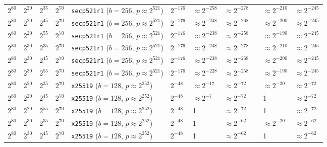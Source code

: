 \begin{table}[p]
\begin{tabular}{@{}lllllllllll@{}}
\midrule
$2^{80}$	&$2^{20}$	&$2^{35}$	&$2^{70}$	&\texttt{secp521r1} ($b \!=\! 256$,\! $p \!\approx\! 2^{521}$)	&$2^{-176}$	&$\approx 2^{-258}$	& $\approx 2^{-278}$	&& $\approx 2^{-210}$	& $\approx 2^{-245}$	 \\
$2^{80}$	&$2^{20}$	&$2^{45}$	&$2^{70}$	&\texttt{secp521r1} ($b \!=\! 256$,\! $p \!\approx\! 2^{521}$)	&$2^{-176}$	&$\approx 2^{-248}$	& $\approx 2^{-268}$	&& $\approx 2^{-200}$	& $\approx 2^{-245}$	 \\
$2^{80}$	&$2^{20}$	&$2^{55}$	&$2^{70}$	&\texttt{secp521r1} ($b \!=\! 256$,\! $p \!\approx\! 2^{521}$)	&$2^{-176}$	&$\approx 2^{-238}$	& $\approx 2^{-258}$	&& $\approx 2^{-190}$	& $\approx 2^{-245}$	 \\
$2^{80}$	&$2^{30}$	&$2^{35}$	&$2^{70}$	&\texttt{secp521r1} ($b \!=\! 256$,\! $p \!\approx\! 2^{521}$)	&$2^{-176}$	&$\approx 2^{-248}$	& $\approx 2^{-278}$	&& $\approx 2^{-210}$	& $\approx 2^{-245}$	 \\
$2^{80}$	&$2^{30}$	&$2^{45}$	&$2^{70}$	&\texttt{secp521r1} ($b \!=\! 256$,\! $p \!\approx\! 2^{521}$)	&$2^{-176}$	&$\approx 2^{-238}$	& $\approx 2^{-268}$	&& $\approx 2^{-200}$	& $\approx 2^{-245}$	 \\
$2^{80}$	&$2^{30}$	&$2^{55}$	&$2^{70}$	&\texttt{secp521r1} ($b \!=\! 256$,\! $p \!\approx\! 2^{521}$)	&$2^{-176}$	&$\approx 2^{-228}$	& $\approx 2^{-258}$	&& $\approx 2^{-190}$	& $\approx 2^{-245}$	 \\
\midrule
$2^{80}$	&$2^{20}$	&$2^{35}$	&$2^{70}$	&\texttt{x25519} ($b \!=\! 128$,\! $p \!\approx\! 2^{252}$)	&$2^{-48}$	&\cellcolor{red!25}$\approx 2^{-17}$	&$\approx 2^{-72}$	&& \cellcolor{red!25}$\approx 2^{-20}$	&$\approx 2^{-72}$	 \\
$2^{80}$	&$2^{20}$	&$2^{45}$	&$2^{70}$	&\texttt{x25519} ($b \!=\! 128$,\! $p \!\approx\! 2^{252}$)	&$2^{-48}$	&\cellcolor{red!25}$\approx 2^{-7}$	&$\approx 2^{-72}$	&& \cellcolor{red!25}1			&$\approx 2^{-72}$	 \\
$2^{80}$	&$2^{20}$	&$2^{55}$	&$2^{70}$	&\texttt{x25519} ($b \!=\! 128$,\! $p \!\approx\! 2^{252}$)	&$2^{-48}$	&\cellcolor{red!25}1			&$\approx 2^{-72}$	&& \cellcolor{red!25}1			&$\approx 2^{-72}$	 \\
$2^{80}$	&$2^{30}$	&$2^{35}$	&$2^{70}$	&\texttt{x25519} ($b \!=\! 128$,\! $p \!\approx\! 2^{252}$)	&$2^{-48}$	&\cellcolor{red!25}1			&$\approx 2^{-62}$	&& \cellcolor{red!25}$\approx 2^{-20}$	&$\approx 2^{-62}$	 \\
$2^{80}$	&$2^{30}$	&$2^{45}$	&$2^{70}$	&\texttt{x25519} ($b \!=\! 128$,\! $p \!\approx\! 2^{252}$)	&$2^{-48}$	&\cellcolor{red!25}1			&$\approx 2^{-62}$	&& \cellcolor{red!25}1			&$\approx 2^{-62}$	 \\

\end{tabular}
\end{table}

